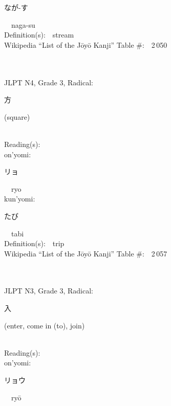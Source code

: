 \begin{multicols}{2}
{\hspace*{2em}}{\begin{CJK}{UTF8}{min} なが-す \end{CJK}}\ \ naga-su\ \ \\
Definition(s):\ \ stream \\
Wikipedia ``List of the J\=oy\=o Kanji'' Table \#:\ \ 2\,050 \\
\ \ \\
{\fontsize{34pt}{40pt}  }\ \ \\  %
{JLPT N4, Grade 3, Radical:\ \ {\begin{CJK}{UTF8}{min} 方 \end{CJK}} (square) } \\
Reading(s):\ \ \\
{\hspace*{1em}}on'yomi:\ \ \\
{\hspace*{2em}}{\begin{CJK}{UTF8}{min} リョ \end{CJK}}\ \ ryo\ \ \\
{\hspace*{1em}}kun'yomi:\ \ \\
{\hspace*{2em}}{\begin{CJK}{UTF8}{min} たび \end{CJK}}\ \ tabi\ \ \\
Definition(s):\ \ trip \\
Wikipedia ``List of the J\=oy\=o Kanji'' Table \#:\ \ 2\,057 \\
\ \ \\
{\fontsize{34pt}{40pt}  }\ \ \\  %
{JLPT N3, Grade 3, Radical:\ \ {\begin{CJK}{UTF8}{min} 入 \end{CJK}} (enter, come in (to), join) } \\
Reading(s):\ \ \\
{\hspace*{1em}}on'yomi:\ \ \\
{\hspace*{2em}}{\begin{CJK}{UTF8}{min} リョウ \end{CJK}}\ \ ry\=o\ \ \\

\end{multicols}
